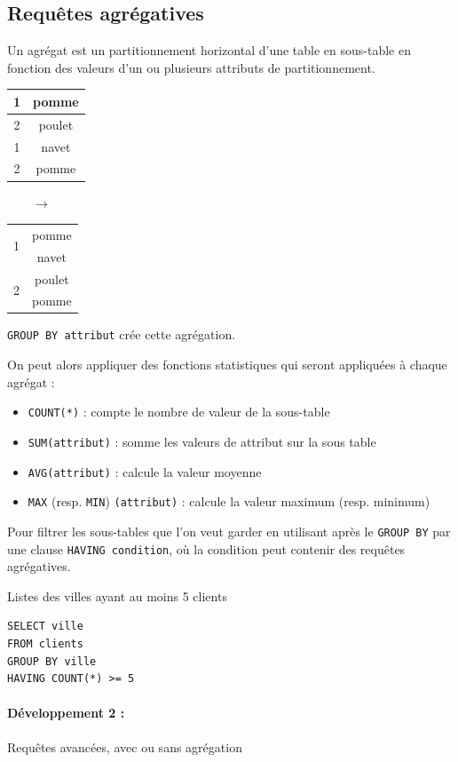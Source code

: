 \subsection{Requêtes agrégatives}

\begin{definition}
	Un agrégat est un partitionnement horizontal d’une table en sous-table en fonction des valeurs d’un ou plusieurs attributs de partitionnement.
\end{definition}

\begin{personalise}[Schéma]
	\begin{tabular}{|c|c|}
		\hline 1 & pomme \\
		\hline 2 & poulet \\
		\hline 1 & navet \\
		\hline 2 & pomme \\
		\hline
	\end{tabular} $\qquad \to \qquad$ \begin{tabular}{|c|c|}
		\hline \multirow{2}{*}{1} & pomme \\
		\cline{2-2} & navet \\
		\hline \multirow{2}{*}{2} & poulet \\
		\cline{2-2} & pomme \\
		\hline 
\end{tabular}
\end{personalise}

\begin{syntaxe}
	\texttt{GROUP BY attribut} crée cette agrégation.
\end{syntaxe}

On peut alors appliquer des fonctions statistiques qui seront appliquées à chaque agrégat : \begin{itemize}[label=$\bullet$]
	\item \texttt{COUNT(*)} : compte le nombre de valeur de la sous-table
	\item \texttt{SUM(attribut)} : somme les valeurs de attribut sur la sous table
	\item \texttt{AVG(attribut)} : calcule la valeur moyenne
	\item \texttt{MAX} (resp. \texttt{MIN}) \texttt{(attribut)} : calcule la valeur maximum (resp. minimum)
\end{itemize}

\begin{syntaxe}
	Pour filtrer les sous-tables que l'on veut garder en utilisant après le \texttt{GROUP BY} par une clause \texttt{HAVING condition}, où la condition peut contenir des requêtes agrégatives.
\end{syntaxe}

\begin{example}
	Listes des villes ayant au moins 5 clients
	\begin{lstlisting}
SELECT ville
FROM clients
GROUP BY ville
HAVING COUNT(*) >= 5
	\end{lstlisting}
\end{example}

\paragraph{Développement 2 :} Requêtes avancées, avec ou sans agrégation